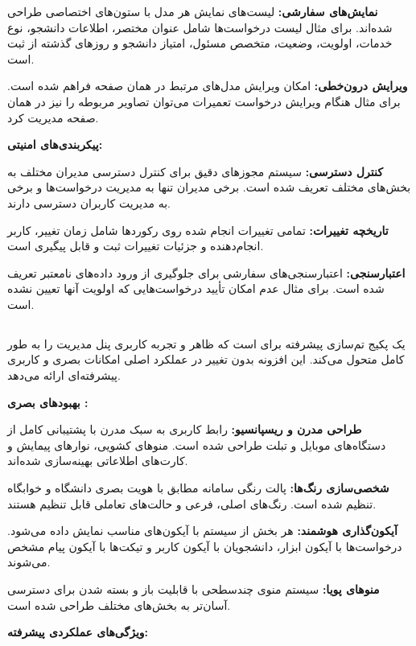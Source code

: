 \documentclass[12pt,a4paper]{report}
\begin{document}
	\textbf{نمایش‌های سفارشی:} لیست‌های نمایش هر مدل با ستون‌های اختصاصی طراحی شده‌اند. برای مثال لیست درخواست‌ها شامل عنوان مختصر، اطلاعات دانشجو، نوع خدمات، اولویت، وضعیت، متخصص مسئول، امتیاز دانشجو و روزهای گذشته از ثبت است.
	
	\textbf{ویرایش درون‌خطی:} امکان ویرایش مدل‌های مرتبط در همان صفحه فراهم شده است. برای مثال هنگام ویرایش درخواست تعمیرات می‌توان تصاویر مربوطه را نیز در همان صفحه مدیریت کرد.
	
	\textbf{پیکربندی‌های امنیتی:}
	
	\textbf{کنترل دسترسی:} سیستم مجوزهای دقیق برای کنترل دسترسی مدیران مختلف به بخش‌های مختلف تعریف شده است. برخی مدیران تنها به مدیریت درخواست‌ها و برخی به مدیریت کاربران دسترسی دارند.
	
	\textbf{تاریخچه تغییرات:} تمامی تغییرات انجام شده روی رکوردها شامل زمان تغییر، کاربر انجام‌دهنده و جزئیات تغییرات ثبت و قابل پیگیری است.
	
	\textbf{اعتبارسنجی:} اعتبارسنجی‌های سفارشی برای جلوگیری از ورود داده‌های نامعتبر تعریف شده است. برای مثال عدم امکان تأیید درخواست‌هایی که اولویت آنها تعیین نشده است.
	
	\subsection{}
	
	 یک پکیج تم‌سازی پیشرفته برای  است که ظاهر و تجربه کاربری پنل مدیریت را به طور کامل متحول می‌کند. این افزونه بدون تغییر در عملکرد اصلی  امکانات بصری و کاربری پیشرفته‌ای ارائه می‌دهد.
	
	\textbf{بهبودهای بصری :}
	
	\textbf{طراحی مدرن و ریسپانسیو:} رابط کاربری به سبک مدرن با پشتیبانی کامل از دستگاه‌های موبایل و تبلت طراحی شده است. منوهای کشویی، نوارهای پیمایش و کارت‌های اطلاعاتی بهینه‌سازی شده‌اند.
	
	\textbf{شخصی‌سازی رنگ‌ها:} پالت رنگی سامانه مطابق با هویت بصری دانشگاه و خوابگاه تنظیم شده است. رنگ‌های اصلی، فرعی و حالت‌های تعاملی قابل تنظیم هستند.
	
	\textbf{آیکون‌گذاری هوشمند:} هر بخش از سیستم با آیکون‌های  مناسب نمایش داده می‌شود. درخواست‌ها با آیکون ابزار، دانشجویان با آیکون کاربر و تیکت‌ها با آیکون پیام مشخص می‌شوند.
	
	\textbf{منوهای پویا:} سیستم منوی چندسطحی با قابلیت باز و بسته شدن برای دسترسی آسان‌تر به بخش‌های مختلف طراحی شده است.
	
	\textbf{ویژگی‌های عملکردی پیشرفته:}
	
\end{document}
